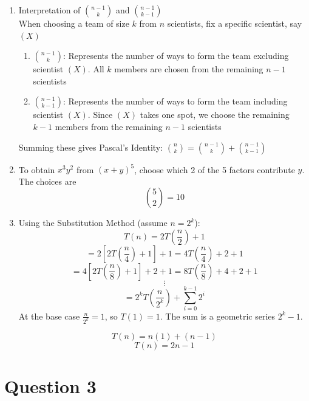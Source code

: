 \documentclass[twoside]{article}
\begin{document}
\begin{enumerate}
    \item[(a)]  Interpretation of \(\binom{n-1}{k}\)  and \(\binom{n-1}{k-1}\) \\
                When choosing a team of size \(k\) from \(n\) scientists, fix a specific scientist, say \((X)\)
                \begin{enumerate}
                    \item[i.]  \(\binom{n-1}{k}\): Represents the number of ways to form the team excluding scientist \((X)\). All $k$ members are chosen from the remaining \(n-1\) scientists
                    \item[ii.] \(\binom{n-1}{k-1}\): Represents the number of ways to form the team including scientist \((X)\). Since \((X)\) takes one spot, we choose the remaining $k-1$ members from the remaining $n-1$ scientists
                \end{enumerate}
                Summing these gives Pascal's Identity: \(\binom{n}{k} = \binom{n-1}{k} + \binom{n-1}{k-1}\)
    \item[(b)]  To obtain $x^3 y^2$ from $(x+y)^5$, choose which 2 of the 5 factors contribute $y$.  
                The choices are \[\binom{5}{2} = 10\] 
    \item[(c)]  Using the Substitution Method (assume $n=2^k$):
                \[ T(n) = 2T\left(\frac{n}{2}\right) + 1 \]
                \[ = 2\left[2T\left(\frac{n}{4}\right) + 1\right] + 1 = 4T\left(\frac{n}{4}\right) + 2 + 1 \]
                \[ = 4\left[2T\left(\frac{n}{8}\right) + 1\right] + 2 + 1 = 8T\left(\frac{n}{8}\right) + 4 + 2 + 1\]
                \[ \vdots \]
                \[ = 2^k T\left(\frac{n}{2^k}\right) + \sum_{i=0}^{k-1} 2^i \]    
                At the base case $\frac{n}{2^k}=1$, so $T(1)=1$. The sum is a geometric series $2^k - 1$.
    
                \[ T(n) = n(1) + (n-1) \]
                \[ T(n) = 2n - 1 \]
\end{enumerate}


\newpage

\section*{Question 3}
\end{document}
